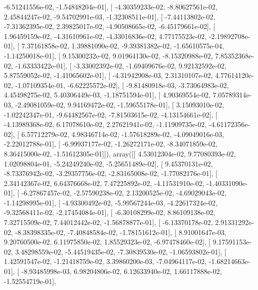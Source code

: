 \documentclass{article}
\begin{document}
         -6.51241556e-02,  -1.54848204e-01],
       [ -4.30359233e-02,  -8.80627561e-02,   2.45844247e-02,
         -9.54702991e-03,  -1.32308511e-01],
       [ -7.44113802e-02,  -7.31362395e-02,   2.39825017e-02,
         -4.90508665e-02,  -6.45179661e-02],
       [  1.96459159e-02,  -4.31610961e-02,  -4.33016836e-02,
          4.77175523e-02,  -2.19892708e-01],
       [  7.37161858e-02,   1.39881090e-02,  -9.39381382e-02,
         -1.65610575e-04,  -1.14250018e-01],
       [  9.15300232e-02,   9.01964130e-02,  -8.15320988e-02,
          7.85352368e-02,  -1.63333422e-01],
       [ -3.33002392e-02,  -1.69409676e-02,   9.92132592e-02,
          5.87559052e-02,  -1.41065602e-01],
       [ -4.31942908e-03,   2.31310107e-02,   4.77614120e-02,
         -1.07109354e-01,  -6.62225572e-02],
       [ -9.81480918e-03,  -3.73064983e-02,   4.45498275e-02,
          5.40306449e-03,  -1.18751594e-01],
       [  4.90369554e-02,   7.05789314e-03,  -2.49081059e-02,
          9.94169472e-02,  -1.59655178e-01],
       [  3.15093010e-02,  -1.02242347e-01,  -9.64482567e-02,
         -7.81503615e-02,  -4.13154661e-02],
       [ -4.13989368e-02,   6.17078610e-02,   2.27621941e-02,
         -1.11909735e-02,  -4.61172356e-02],
       [  6.57712279e-02,   4.98346714e-02,  -1.57618289e-02,
         -4.09049016e-03,  -2.22012788e-01],
       [ -6.99937177e-02,  -1.26272171e-02,  -8.34071859e-02,
          8.36415000e-02,  -1.51612305e-01]]), array([[  4.53012304e-02,   9.77080393e-02,   1.02098804e-01,
         -5.24249240e-02,  -5.25651489e-02],
       [  9.45370131e-02,  -8.73376942e-02,  -3.29357756e-02,
         -2.83165008e-02,  -1.77082176e-01],
       [  2.34142367e-02,   6.64376668e-02,   7.47225892e-02,
         -4.11531910e-02,  -1.40331090e-01],
       [ -6.27867457e-02,  -2.57590238e-02,   2.13200525e-02,
         -4.69029043e-02,  -1.14298995e-01],
       [ -4.93300492e-02,  -5.99567244e-03,  -4.22617324e-02,
         -9.32568411e-02,  -2.17454084e-01],
       [ -6.30108299e-02,   8.86109138e-02,   7.32715509e-02,
          7.44012442e-02,  -1.56878877e-01],
       [ -6.13370178e-02,   2.91331292e-02,  -8.38398335e-02,
         -7.40848584e-02,  -1.78151612e-01],
       [  8.91001647e-03,   9.20760500e-02,   6.11975850e-02,
          1.85529323e-02,  -6.97478460e-02],
       [  9.17591153e-02,   3.48298559e-02,  -5.44519435e-02,
         -7.30839530e-02,  -1.06593802e-01],
       [  1.42591547e-02,  -1.21418759e-02,   3.39860200e-03,
         -7.04964117e-02,  -1.68214663e-01],
       [ -8.93485998e-03,   6.98204806e-02,   6.12633940e-02,
          1.66117888e-02,  -1.52554719e-01],
\end{document}
